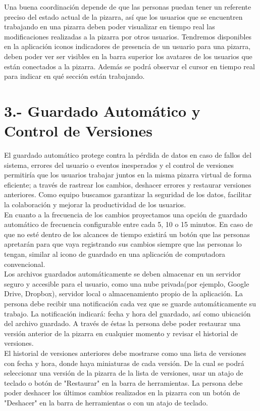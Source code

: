 \documentclass[a4paper, oneside, final]{scrartcl}
\begin{document}
Una buena coordinación depende de que las personas puedan tener un referente preciso del estado actual de la pizarra, así que los usuarios que se encuentren trabajando en una pizarra deben poder visualizar en tiempo real las modificaciones realizadas a la pizarra por otros usuarios. Tendremos disponibles en la aplicación iconos indicadores de presencia de un usuario para una pizarra, deben poder ver ser visibles en la barra superior los avatares de los usuarios que están conectados a la pizarra. Además se podrá observar el cursor en tiempo real para indicar en qué sección están trabajando.


\noindent
\section{3.- Guardado Automático y Control de Versiones} %

  El guardado automático protege contra la pérdida de datos en caso de fallos del sistema, errores del usuario o eventos inesperados y el control de versiones permitiría que los usuarios trabajar juntos en la misma pizarra virtual de forma eficiente; a través de rastrear los cambios, deshacer errores y restaurar versiones anteriores. Como equipo buscamos garantizar la seguridad de los datos, facilitar la colaboración y mejorar la productividad de los usuarios.\\

  
 En cuanto a la frecuencia de los cambios proyectamos una opción de guardado automático de frecuencia configurable entre cada 5, 10 o 15 minutos. En caso de que no esté dentro de los alcances de tiempo existirá un botón que las personas apretarán para que vaya registrando sus cambios siempre que las personas lo tengan, similar al icono de guardado en una aplicación de computadora convencional.\\
    
Los archivos guardados automáticamente se deben almacenar en un servidor seguro y accesible para el usuario, como una nube privada(por ejemplo, Google Drive, Dropbox), servidor local o almacenamiento propio de la aplicación. La persona debe recibir una notificación cada vez que se guarde automáticamente su trabajo. La notificación indicará: fecha y hora del guardado, así como ubicación del archivo guardado. A través de éstas la persona debe poder restaurar una versión anterior de la pizarra en cualquier momento y revisar el historial de versiones.\\

El historial de versiones anteriores debe mostrarse como una lista de versiones con fecha y hora, donde haya miniaturas de cada versión. De la cual se podrá seleccionar una versión de la pizarra de la lista de versiones, usar un atajo de teclado o botón de "Restaurar" en la barra de herramientas. La persona debe poder deshacer los últimos cambios realizados en la pizarra con un botón de "Deshacer" en la barra de herramientas o con un atajo de teclado.
    
\end{document}
